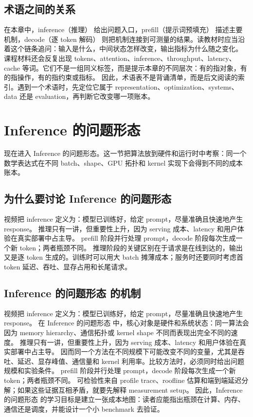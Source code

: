 \documentclass[a4paper]{article}
\begin{document}
\subsection{术语之间的关系}
在本章中，inference（推理） 给出问题入口，prefill（提示词预填充） 描述主要机制，decode（逐 token 解码） 则把机制连接到可测量的结果。读教材时应当沿着这个链条追问：输入是什么，中间状态怎样改变，输出指标为什么随之变化。
课程材料还会反复出现 tokens、attention、inference、throughput、latency、cache 等词。它们不是一组同义标签，而是提示本章的不同层次：有的指对象，有的指操作，有的指约束或指标。
因此，术语表不是背诵清单，而是后文阅读的索引。遇到一个术语时，先定位它属于 representation、optimization、systems、data 还是 evaluation，再判断它改变哪一项账本。
\section{Inference 的问题形态}
现在进入 Inference 的问题形态。这一节把算法放到硬件和运行时中考察：同一个数学表达式在不同 batch、shape、GPU 拓扑和 kernel 实现下会得到不同的成本账本。
\subsection{为什么要讨论 Inference 的问题形态}
视频把 inference 定义为：模型已训练好，给定 prompt，尽量准确且快速地产生 response。
推理只有一讲，但重要性上升，因为 serving 成本、latency 和用户体验在真实部署中占主导。
prefill 阶段并行处理 prompt，decode 阶段每次生成一个新 token；两者瓶颈不同。
推理阶段的关键区别在于请求是在线到达的，输出又是逐 token 生成的。训练时可以用大 batch 摊薄成本；服务时还要同时考虑首 token 延迟、吞吐、显存占用和长尾请求。
\subsection{Inference 的问题形态 的机制}
视频把 inference 定义为：模型已训练好，给定 prompt，尽量准确且快速地产生 response。 在 Inference 的问题形态 中，核心对象是硬件和系统状态：同一算法会因为 memory hierarchy、通信拓扑或 kernel shape 不同而表现出完全不同的速度。
推理只有一讲，但重要性上升，因为 serving 成本、latency 和用户体验在真实部署中占主导。 因而同一个方法在不同规模下可能改变不同的变量，尤其是吞吐、延迟、显存峰值、通信量和 kernel 利用率。比较方法时，必须同时给出问题规模和实验条件。
prefill 阶段并行处理 prompt，decode 阶段每次生成一个新 token；两者瓶颈不同。 可检验性来自 profile trace、roofline 估算和端到端延迟分解；如果这些证据互相矛盾，就要先解释 measurement setup。
因此，Inference 的问题形态 的学习目标是建立一张成本地图：读者应能指出瓶颈在计算、内存、通信还是调度，并能设计一个小 benchmark 去验证。
\end{document}
